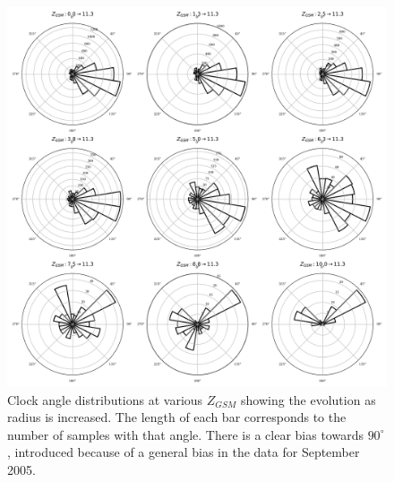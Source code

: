 \documentclass{article}
\begin{document}
\begin{figure}
    \centering
    \includegraphics[width=0.9\linewidth]{imf_radialHistGSM.png}
    \caption{Clock angle distributions at various $Z_{GSM}$ showing the evolution as radius is increased. The length of each bar corresponds to the number of samples with that angle. There is a clear bias towards $90^\circ$, introduced because of a general bias in the data for September 2005.}
    \label{fig:imf_radialHist}
\end{figure}
\begin{multicols}{2}

\printbibliography
\end{multicols}
\end{document}
